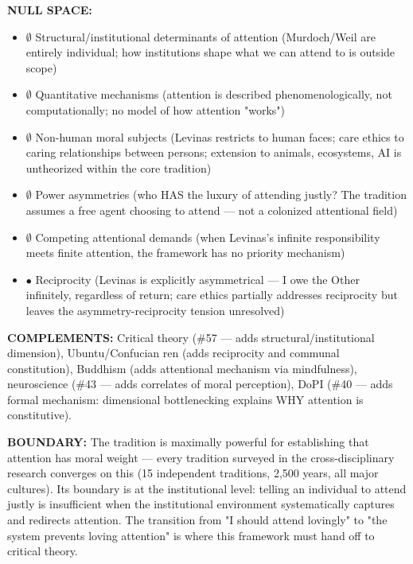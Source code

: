\textbf{NULL SPACE:}

\begin{itemize}[nosep,leftmargin=*]
  \item $\emptyset$ Structural/institutional determinants of attention (Murdoch/Weil are entirely individual; how institutions shape what we can attend to is outside scope)
  \item $\emptyset$ Quantitative mechanisms (attention is described phenomenologically, not computationally; no model of how attention "works")
  \item $\emptyset$ Non-human moral subjects (Levinas restricts to human faces; care ethics to caring relationships between persons; extension to animals, ecosystems, AI is untheorized within the core tradition)
  \item $\emptyset$ Power asymmetries (who HAS the luxury of attending justly? The tradition assumes a free agent choosing to attend — not a colonized attentional field)
  \item $\emptyset$ Competing attentional demands (when Levinas's infinite responsibility meets finite attention, the framework has no priority mechanism)
  \item $\bullet$ Reciprocity (Levinas is explicitly asymmetrical — I owe the Other infinitely, regardless of return; care ethics partially addresses reciprocity but leaves the asymmetry-reciprocity tension unresolved)
\end{itemize}


\textbf{COMPLEMENTS:} Critical theory (\#57 — adds structural/institutional dimension), Ubuntu/Confucian ren (adds reciprocity and communal constitution), Buddhism (adds attentional mechanism via mindfulness), neuroscience (\#43 — adds correlates of moral perception), DoPI (\#40 — adds formal mechanism: dimensional bottlenecking explains WHY attention is constitutive).


\textbf{BOUNDARY:} The tradition is maximally powerful for establishing that attention has moral weight — every tradition surveyed in the cross-disciplinary research converges on this (15 independent traditions, 2,500 years, all major cultures). Its boundary is at the institutional level: telling an individual to attend justly is insufficient when the institutional environment systematically captures and redirects attention. The transition from "I should attend lovingly" to "the system prevents loving attention" is where this framework must hand off to critical theory.


